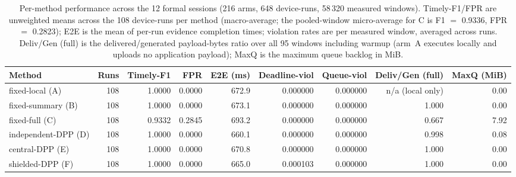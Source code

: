 \begin{table}[t]
\centering
\caption{Per-method performance across the 12 formal sessions (216 arms, 648 device-runs, 58\,320 measured windows). Timely-F1/FPR are unweighted means across the 108 device-runs per method (macro-average; the pooled-window micro-average for C is F1 $=$ 0.9336, FPR $=$ 0.2823); E2E is the mean of per-run evidence completion times; violation rates are per measured window, averaged across runs. Deliv/Gen (full) is the delivered/generated payload-bytes ratio over all 95 windows including warmup (arm~A executes locally and uploads no application payload); MaxQ is the maximum queue backlog in MiB.}
\label{tab:method-overview}
\begin{tabular}{lrrrrrrrr}
\toprule
Method & Runs & Timely-F1 & FPR & E2E (ms) & Deadline-viol & Queue-viol & Deliv/Gen (full) & MaxQ (MiB) \\
\midrule
fixed-local (A) & 108 & 1.0000 & 0.0000 & 672.9 & 0.000000 & 0.000000 & n/a (local only) & 0.00 \\
fixed-summary (B) & 108 & 1.0000 & 0.0000 & 673.1 & 0.000000 & 0.000000 & 1.000 & 0.00 \\
fixed-full (C) & 108 & 0.9332 & 0.2845 & 693.2 & 0.000000 & 0.000000 & 0.667 & 7.92 \\
independent-DPP (D) & 108 & 1.0000 & 0.0000 & 660.1 & 0.000000 & 0.000000 & 0.998 & 0.08 \\
central-DPP (E) & 108 & 1.0000 & 0.0000 & 670.8 & 0.000000 & 0.000000 & 1.000 & 0.00 \\
shielded-DPP (F) & 108 & 1.0000 & 0.0000 & 665.0 & 0.000103 & 0.000000 & 1.000 & 0.00 \\
\bottomrule
\end{tabular}
\end{table}
